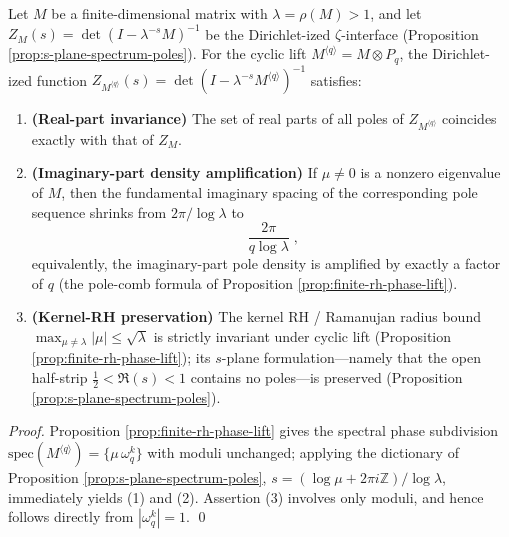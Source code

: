 \begin{corollary}\label{cor:zeta-cyclic-lift-dirichlet-comb}
Let \(M\) be a finite-dimensional matrix with \(\lambda=\rho(M)>1\), and let
\(
Z_M(s)=\det(I-\lambda^{-s}M)^{-1}
\)
be the Dirichlet-ized \(\zeta\)-interface (Proposition \ref{prop:s-plane-spectrum-poles}).
For the cyclic lift \(M^{\langle q\rangle}=M\otimes P_q\), the Dirichlet-ized function
\(
Z_{M^{\langle q\rangle}}(s)=\det(I-\lambda^{-s}M^{\langle q\rangle})^{-1}
\)
satisfies:
\begin{enumerate}
  \item \textbf{(Real-part invariance)} The set of real parts of all poles of \(Z_{M^{\langle q\rangle}}\) coincides exactly with that of \(Z_M\).
  \item \textbf{(Imaginary-part density amplification)} If \(\mu\neq 0\) is a nonzero eigenvalue of \(M\), then the fundamental imaginary spacing of the corresponding pole sequence shrinks from \(2\pi/\log\lambda\) to
  \[
  \boxed{\;
  \frac{2\pi}{q\log\lambda}\; },
  \]
  equivalently, the imaginary-part pole density is amplified by exactly a factor of \(q\) (the pole-comb formula of Proposition \ref{prop:finite-rh-phase-lift}).
  \item \textbf{(Kernel-RH preservation)} The kernel RH / Ramanujan radius bound
  \(
  \max_{\mu\neq\lambda}|\mu|\le \sqrt{\lambda}
  \)
  is strictly invariant under cyclic lift (Proposition \ref{prop:finite-rh-phase-lift}); its \(s\)-plane formulation---namely that the open half-strip \(\tfrac12<\Re(s)<1\) contains no poles---is preserved (Proposition \ref{prop:s-plane-spectrum-poles}).
\end{enumerate}
\end{corollary}
\begin{proof}
Proposition \ref{prop:finite-rh-phase-lift} gives the spectral phase subdivision
\(
\mathrm{spec}(M^{\langle q\rangle})=\{\mu\,\omega_q^k\}
\)
with moduli unchanged; applying the dictionary of Proposition \ref{prop:s-plane-spectrum-poles},
\(
s=(\log\mu+2\pi i\mathbb{Z})/\log\lambda
\),
immediately yields (1) and (2).
Assertion (3) involves only moduli, and hence follows directly from \(|\omega_q^k|=1\). \qed
\end{proof}

